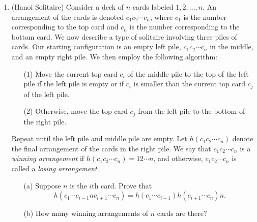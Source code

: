 \documentclass[11pt]{scrartcl}
\theoremstyle{definition}
\begin{document}
\begin{enumerate}
\item (Hanoi Solitaire) Consider a deck of $n$ cards labeled $1,2,\ldots, n$. An arrangement of the cards is denoted $c_1c_2\cdots c_n$, where $c_1$ is the number corresponding to the top card and $c_n$ is the number corresponding to the bottom card.  We now describe a type of solitaire involving three piles of cards. Our starting configuration is an empty left pile, $c_1c_2\cdots c_n$ in the middle, and an empty right pile. We then employ the following algorithm:
\begin{enumerate}
\item[(1)] Move the current top card $c_i$ of the middle pile to the top of the left pile if the left pile is empty or if $c_i$ is smaller than the current top card $c_j$ of the left pile.
\item[(2)] Otherwise, move the top card $c_j$ from the left pile to the bottom of the right pile. 
\end{enumerate}
Repeat until the left pile and middle pile are empty. Let $h(c_1c_2\cdots c_n)$ denote the final arrangement of the cards in the right pile.  We say that $c_1c_2\cdots c_n$ is a \emph{winning arrangement} if $h(c_1c_2\cdots c_n)=12\cdots n$, and otherwise, $c_1c_2\cdots c_n$ is called a \emph{losing arrangement}.
\begin{enumerate}
\item[(a)] Suppose $n$ is the $i$th card. Prove that 
\[
h(c_1\cdots c_{i-1}nc_{i+1}\cdots c_n)=h(c_1\cdots c_{i-1})h(c_{i+1}\cdots c_n)n.
\]
\item[(b)] How many winning arrangements of $n$ cards are there?
\end{enumerate}

\end{enumerate}
\end{document}
